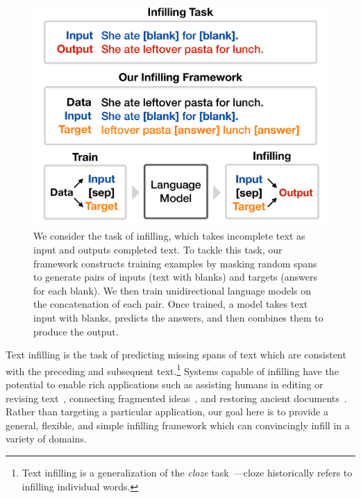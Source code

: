 \begin{figure}[t!]
    \centering
    \includegraphics[width=1\linewidth]{figures/ilm_figure1_final.pdf}
    \caption{
    We consider the task of infilling, which takes incomplete text as input and outputs completed text.
    To tackle this task, our framework constructs training examples by masking random spans to generate pairs of inputs (text with blanks) and targets (answers for each blank). 
    We then train unidirectional language models on the concatenation of each pair.
    Once trained, a model takes text input with blanks, predicts the answers, and then combines them to produce the output.
    }
    \label{fig:infilling_training_example}
    \vspace{-5mm}
\end{figure}

Text infilling is the task of predicting missing spans of text which are consistent with the preceding and subsequent text.\footnote{Text infilling is a generalization of the \emph{cloze} task~\citep{taylor1953cloze}---cloze historically refers to infilling individual words.} 
Systems capable of infilling have the potential to enable rich applications such as assisting humans in
editing or revising text~\citep{shih2019xl}, 
connecting fragmented ideas~\citep{ai2019haim}, 
and restoring ancient documents~\citep{assael2019restoring}. 
Rather than targeting a particular application, our goal here is to provide a general, flexible, and simple infilling framework which can convincingly infill in a variety of domains.

